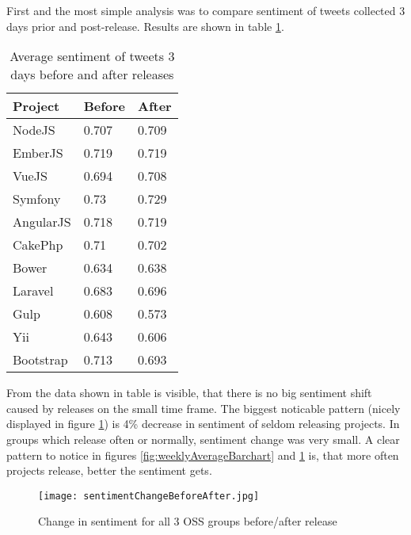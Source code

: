 First and the most simple analysis was to compare sentiment of tweets collected 3 days prior and post-release. Results are shown in table \ref{table:BeforeAfterReleaseSentiment}.

\begin{table}[H]
\centering
\begin{tabular}{ |p{3cm}|p{3cm}|p{3cm}|}
 \hline
\textbf{Project }& \textbf{Before}& \textbf{After}\\
 \hline
 NodeJS   & 0.707 & 0.709\\ \hline
 EmberJS   & 0.719 & 0.719\\ \hline
 VueJS   & 0.694 & 0.708\\ \hline 
 Symfony & 0.73 & 0.729\\ \hline   
 AngularJS   & 0.718 & 0.719\\ \hline
 CakePhp & 0.71 & 0.702\\ \hline 
 Bower   & 0.634 & 0.638\\ \hline 
 Laravel & 0.683 & 0.696\\ \hline
 Gulp & 0.608 & 0.573\\ \hline
 Yii & 0.643 & 0.606\\ \hline
 Bootstrap & 0.713 & 0.693\\ \hline
\end{tabular}
\caption{Average sentiment of tweets 3 days before and after releases}
\label{table:BeforeAfterReleaseSentiment}
\end{table}

From the data shown in table is visible, that there is no big sentiment shift caused by releases on the small time frame. The biggest noticable pattern (nicely displayed in figure \ref{fig:sentimentChangeBeforeAfter}) is 4\% decrease in sentiment of seldom releasing projects. In groups which release often or normally, sentiment change was very small. A clear pattern to notice in figures \ref{fig:weeklyAverageBarchart} and \ref{fig:sentimentChangeBeforeAfter} is, that more often projects release, better the sentiment gets.

\begin{figure}%
    \centering
	\texttt{[image: sentimentChangeBeforeAfter.jpg]}
    \caption{Change in sentiment for all 3 OSS groups before/after release}%
    \label{fig:sentimentChangeBeforeAfter}%
\end{figure}

